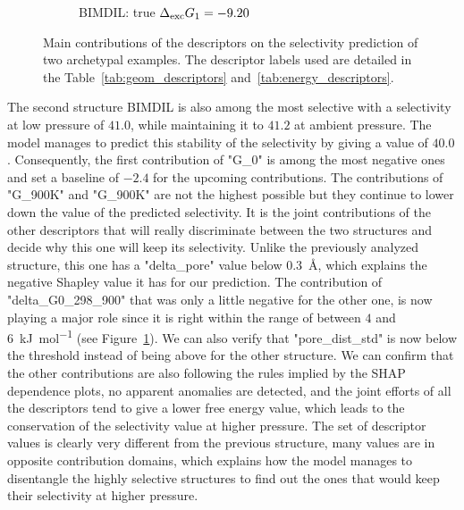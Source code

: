 \documentclass[main]{subfiles}
\begin{document}
\begin{figure}[ht]
\begin{subfigure}[b]{0.47\textwidth}
      \caption{BIMDIL: true $\Delta_{\text{exc}} G_1=-9.20$}
    \end{subfigure}
  \caption{Main contributions of the descriptors on the selectivity prediction of two archetypal examples. The descriptor labels used are detailed in the Table~\ref{tab:geom_descriptors} and~\ref{tab:energy_descriptors}.}\label{fgr:contribution}
\end{figure}

The second structure BIMDIL is also among the most selective with a selectivity at low pressure of $41.0$, while maintaining it to $41.2$ at ambient pressure. The model manages to predict this stability of the selectivity by giving a value of $40.0$. Consequently, the first contribution of "G\_0" is among the most negative ones and set a baseline of $-2.4$ for the upcoming contributions. The contributions of "G\_900K" and "G\_900K" are not the highest possible but they continue to lower down the value of the predicted selectivity. It is the joint contributions of the other descriptors that will really discriminate between the two structures and decide why this one will keep its selectivity. Unlike the previously analyzed structure, this one has a "delta\_pore" value below \SI{0.3}{\angstrom}, which explains the negative Shapley value it has for our prediction. The contribution of "delta\_G0\_298\_900" that was only a little negative for the other one, is now playing a major role since it is right within the range of between $4$ and \SI{6}{\kilo\joule\per\mole} (see Figure~\ref{fgr:contribution}). We can also verify that "pore\_dist\_std" is now below the threshold instead of being above for the other structure. We can confirm that the other contributions are also following the rules implied by the SHAP dependence plots, no apparent anomalies are detected, and the joint efforts of all the descriptors tend to give a lower free energy value, which leads to the conservation of the selectivity value at higher pressure. The set of descriptor values is clearly very different from the previous structure, many values are in opposite contribution domains, which explains how the model manages to disentangle the highly selective structures to find out the ones that would keep their selectivity at higher pressure.
\end{document}
